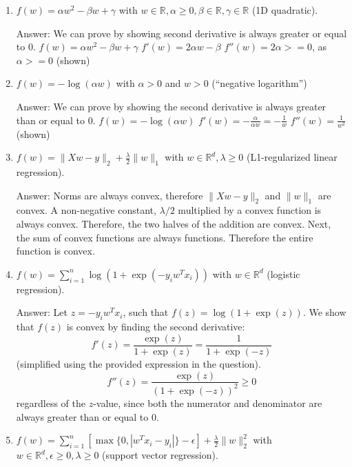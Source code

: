 \documentclass{article}
\newcommand{\gre}[1]{\textcolor{gre}{#1}}
\newcommand\ans[1]{\par\gre{Answer: #1}}
\def\R{\mathbb{R}}
\newcommand{\norm}[1]{\lVert #1 \rVert}
\begin{document}
\begin{enumerate}
\item $f(w) = \alpha w^2 - \beta w + \gamma$ with $w \in \R, \alpha \geq 0, \beta \in \R, \gamma \in \R$ (1D quadratic).

\ans{We can prove by showing second derivative is always greater or equal to 0.
\newline
$f(w) = \alpha w^2 - \beta w + \gamma$
\newline
$f'(w) = 2 \alpha w - \beta $
\newline
$f''(w) = 2 \alpha >= 0$, as $ \alpha >= 0 $ (shown)
}

\item $f(w) = -\log(\alpha w) $ with $\alpha > 0$ and $w > 0$ (``negative logarithm'')

\ans{
We can prove by showing the second derivative is always greater than or equal to 0. \newline
\( f(w) = -\log(\alpha w) \) \newline
\( f'(w) = -\frac{\alpha}{\alpha w} = -\frac{1}{w} \) \newline
\( f''(w) = \frac{1}{w^2} \) (shown)
}

\item $f(w) = \norm{Xw-y}_2 + \frac{\lambda}{2}\norm{w}_1$ with $w \in \R^d, \lambda \geq 0$ (L1-regularized linear regression).

\ans{Norms are always convex, therefore $ \norm{Xw-y}_2 $ and $\norm{w}_1$ are convex. A non-negative constant, $ \lambda / 2 $ multiplied by a convex function is always convex. Therefore, the two halves of the addition are convex. Next, the sum of convex functions are always functions. Therefore the entire function is convex.}

\item $f(w) = \sum_{i=1}^n \log(1+\exp(-y_iw^Tx_i)) $ with $w \in \R^d$ (logistic regression).

\ans{
Let \( z = -y_i w^T x_i \), such that \( f(z) = \log(1 + \exp(z)) \). We show that \( f(z) \) is convex by finding the second derivative: 
\[
f'(z) = \frac{\exp(z)}{1 + \exp(z)} = \frac{1}{1 + \exp(-z)}
\] 
(simplified using the provided expression in the question).
\[
f''(z) = \frac{\exp(z)}{(1 + \exp(-z))^2} \geq 0 
\]
regardless of the \( z \)-value, since both the numerator and denominator are always greater than or equal to 0.
}

\item $f(w) = \sum_{i=1}^n[\max\{0,|w^Tx_i - y_i|\} - \epsilon] + \frac{\lambda}{2}\norm{w}_2^2$  with $w \in \R^d, \epsilon \geq 0, \lambda \geq 0$ (support vector regression).



\end{enumerate}
\end{document}
